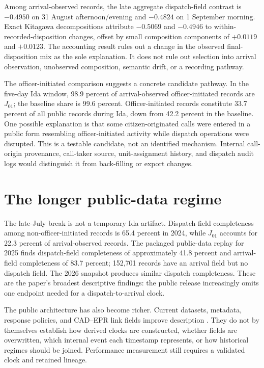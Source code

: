 \documentclass[11pt]{article}
\begin{document}
Among arrival-observed records, the late aggregate dispatch-field contrast is $-0.4950$ on 31 August afternoon/evening and $-0.4824$ on 1 September morning. Exact Kitagawa decompositions attribute $-0.5069$ and $-0.4946$ to within-recorded-disposition changes, offset by small composition components of $+0.0119$ and $+0.0123$. The accounting result rules out a change in the observed final-disposition mix as the sole explanation. It does not rule out selection into arrival observation, unobserved composition, semantic drift, or a recording pathway.

The officer-initiated comparison suggests a concrete candidate pathway. In the five-day Ida window, 98.9 percent of arrival-observed officer-initiated records are $J_{01}$; the baseline share is 99.6 percent. Officer-initiated records constitute 33.7 percent of all public records during Ida, down from 42.2 percent in the baseline. One possible explanation is that some citizen-originated calls were entered in a public form resembling officer-initiated activity while dispatch operations were disrupted. This is a testable candidate, not an identified mechanism. Internal call-origin provenance, call-taker source, unit-assignment history, and dispatch audit logs would distinguish it from back-filling or export changes.

\section{The longer public-data regime}
\label{sec:current}

The late-July break is not a temporary Ida artifact. Dispatch-field completeness among non-officer-initiated records is 65.4 percent in 2024, while $J_{01}$ accounts for 22.3 percent of arrival-observed records. The packaged public-data replay for 2025 finds dispatch-field completeness of approximately 41.8 percent and arrival-field completeness of 83.7 percent; 152,701 records have an arrival field but no dispatch field. The 2026 snapshot produces similar dispatch completeness. These are the paper's broadest descriptive findings: the public release increasingly omits one endpoint needed for a dispatch-to-arrival clock.

The public architecture has also become richer. Current datasets, metadata, response policies, and CAD--EPR link fields improve description \citep{DataNOLA2025,DataNOLA2026,NOPDPolicy2025,NOPDAPR2024}. They do not by themselves establish how derived clocks are constructed, whether fields are overwritten, which internal event each timestamp represents, or how historical regimes should be joined. Performance measurement still requires a validated clock and retained lineage.
\end{document}
